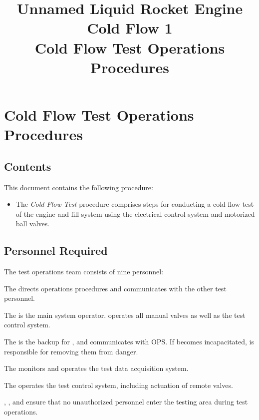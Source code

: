 

\title{
\Huge Unnamed Liquid Rocket Engine\\
Cold Flow 1\\
\vspace{1cm}
\Large Cold Flow Test Operations Procedures}





\section{Cold Flow Test Operations Procedures}

\subsection{Contents}
This document contains the following procedure:
\begin{itemize}
    \item The \textit{Cold Flow Test} procedure comprises steps for conducting a cold flow test of the engine and fill system using the electrical control system and motorized ball valves.
\end{itemize}

\subsection{Personnel Required}
The test operations team consists of nine personnel:
\begin{checklist}
    \item The \opsfull{} directs operations procedures and communicates with the other test personnel.
    \item The \primaryfull{} is the main system operator. \primary{} operates all manual valves as well as the test control system.
    \item The \secondaryfull{} is the backup for \primary{}, and communicates with OPS. If \primary{} becomes incapacitated, \secondary{} is responsible for removing them from danger.
    \item The \daqfull{} monitors and operates the test data acquisition system.
    \item The \controlfull{} operates the test control system, including actuation of remote valves.
    \item \perifull{}, \periifull{}, and \periiifull{} ensure that no unauthorized personnel enter the testing area during test operations.
\end{checklist}
\setcounter{checklistnum}{0}

